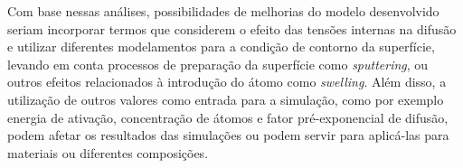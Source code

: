 Com base nessas análises, possibilidades de melhorias do modelo desenvolvido seriam incorporar termos que considerem o efeito das tensões internas na difusão e utilizar diferentes modelamentos para a condição de contorno da superfície, levando em conta processos de preparação da superfície como \textit{sputtering}, ou outros efeitos relacionados à introdução do átomo como \textit{swelling}. Além disso, a utilização de outros valores como entrada para a simulação, como por exemplo energia de ativação, concentração de átomos e fator pré-exponencial de difusão, podem afetar os resultados das simulações ou podem servir para aplicá-las para materiais ou diferentes composições.
